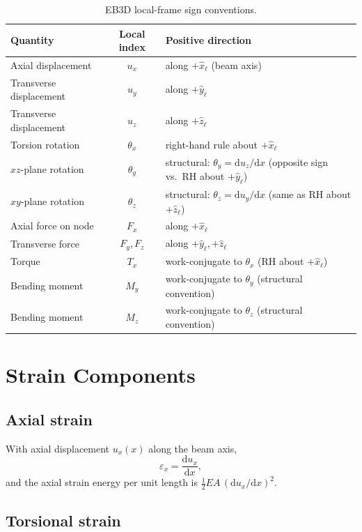 \documentclass[11pt,a4paper]{article}
\newcommand{\dd}{\mathrm{d}}
\begin{document}
\begin{table}[h!]
\centering
\small
\begin{tabular}{l c l}
\toprule
Quantity & Local index & Positive direction \\
\midrule
Axial displacement       & $u_x$         & along $+\hat{x}_\ell$ (beam axis) \\
Transverse displacement  & $u_y$         & along $+\hat{y}_\ell$ \\
Transverse displacement  & $u_z$         & along $+\hat{z}_\ell$ \\
Torsion rotation         & $\theta_x$    & right-hand rule about $+\hat{x}_\ell$ \\
$xz$-plane rotation      & $\theta_y$    & structural: $\theta_y = \dd u_z/\dd x$ (opposite sign vs.\ RH about $+\hat{y}_\ell$) \\
$xy$-plane rotation      & $\theta_z$    & structural: $\theta_z = \dd u_y/\dd x$ (same as RH about $+\hat{z}_\ell$) \\
Axial force on node      & $F_x$         & along $+\hat{x}_\ell$ \\
Transverse force         & $F_y, F_z$    & along $+\hat{y}_\ell, +\hat{z}_\ell$ \\
Torque                   & $T_x$         & work-conjugate to $\theta_x$ (RH about $+\hat{x}_\ell$) \\
Bending moment           & $M_y$         & work-conjugate to $\theta_y$ (structural convention) \\
Bending moment           & $M_z$         & work-conjugate to $\theta_z$ (structural convention) \\
\bottomrule
\end{tabular}
\caption{EB3D local-frame sign conventions.}
\end{table}

\section{Strain Components}

\subsection{Axial strain}

With axial displacement $u_x(x)$ along the beam axis,
\[
\varepsilon_{x} = \frac{\dd u_x}{\dd x},
\]
and the axial strain energy per unit length is $\tfrac{1}{2} EA\,(\dd u_x/\dd x)^2$.

\subsection{Torsional strain}
\end{document}
